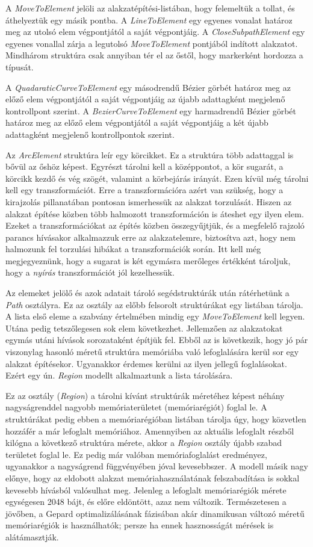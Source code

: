 \documentclass[12pt]{report}
\theoremstyle{definition}
\newcommand{\func}[1]{{\textsl{#1}}}
\begin{document}
A \func{MoveToElement} jelöli az alakzatépítési-listában, hogy felemeltük a
tollat, és áthelyeztük egy másik pontba. A \func{LineToElement} egy egyenes
vonalat határoz meg az utolsó elem végpontjától a saját végpontjáig. A
\func{CloseSubpathElement} egy egyenes vonallal zárja a legutolsó
\func{MoveToElement} pontjából indított alakzatot. Mindhárom struktúra csak
annyiban tér el az őstől, hogy markerként hordozza a típusát.

A \func{QuadaraticCurveToElement} egy másodrendű Bézier görbét határoz meg az
előző elem végpontjától a saját végpontjáig az újabb adattagként megjelenő
kontrollpont szerint. A \func{BezierCurveToElement} egy harmadrendű Bézier
görbét határoz meg az előző elem végpontjától a saját végpontjáig a két újabb
adattagként megjelenő kontrollpontok szerint.

Az \func{ArcElement} struktúra leír egy körcikket. Ez a struktúra több
adattaggal is bővül az őshöz képest. Egyrészt tárolni kell a középpontot, a kör
sugarát, a körcikk kezdő és vég szögét, valamint a körbejárás irányát. Ezen
kívül még tárolni kell egy transzformációt. Erre a transzformációra azért van
szükség, hogy a kirajzolás pillanatában pontosan ismerhessük az alakzat
torzulását. Hiszen az alakzat építése közben több halmozott transzformáción is
áteshet egy ilyen elem. Ezeket a transzformációkat az építés közben
összegyűjtjük, és a megfelelő rajzoló parancs hívásakor alkalmazzuk erre az
alakzatelemre, biztosítva azt, hogy nem halmozunk fel torzulási hibákat a
transzformációk során. Itt kell még megjegyeznünk, hogy a sugarat is két
egymásra merőleges értékként tároljuk, hogy a \emph{nyírás} transzformációt jól
kezelhessük.

Az elemeket jelölő és azok adatait tároló segédstruktúrák után rátérhetünk a
\func{Path} osztályra. Ez az osztály az előbb felsorolt struktúrákat egy
listában tárolja. A lista első eleme a szabvány értelmében mindig egy
\func{MoveToElement} kell legyen. Utána pedig tetszőlegesen sok elem
következhet. Jellemzően az alakzatokat egymás utáni hívások sorozataként
építjük fel. Ebből az is következik, hogy jó pár viszonylag hasonló méretű
struktúra memóriába való lefoglalására kerül sor egy alakzat építésekor.
Ugyanakkor érdemes kerülni az ilyen jellegű foglalásokat. Ezért egy ún.
\emph{Region} modellt alkalmaztunk a lista tárolására.

Ez az osztály (\func{Region}) a tárolni kívánt struktúrák méretéhez képest
néhány nagyságrenddel nagyobb memóriaterületet (memóriarégiót) foglal le. A
struktúrákat pedig ebben a memóriarégióban listában tárolja úgy, hogy közvetlen
hozzáfér a már lefoglalt memóriához. Amennyiben az aktuális lefoglalt részből
kilógna a következő struktúra mérete, akkor a \func{Region} osztály újabb
szabad területet foglal le. Ez pedig már valóban memóriafoglalást eredményez,
ugyanakkor a nagyságrend függvényében jóval kevesebbszer. A modell másik nagy
előnye, hogy az eldobott alakzat memóriahasználatának felszabadítása is sokkal
kevesebb hívásból valósulhat meg. Jelenleg a lefoglalt memóriarégiók mérete
egységesen 2048 bájt, és előre eldöntött, azaz nem változik. Természetesen a
jövőben, a Gepard optimalizálásának fázisában akár dinamikusan változó méretű
memóriarégiók is használhatók; persze ha ennek hasznosságát mérések is
alátámasztják.
\end{document}
